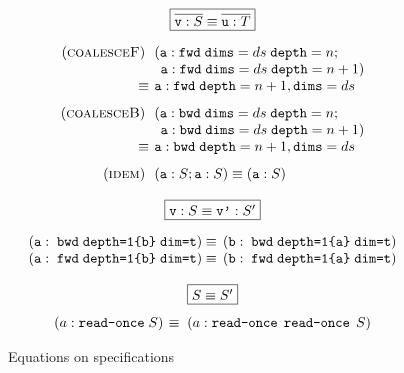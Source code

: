 \documentclass[9pt]{sigplanconf}
\theoremstyle{definition}
\begin{document}
\begin{figure}
\begin{align*}
\hspace{-1em}
\setlength{\arraycolsep}{0.05em}
\begin{array}{c}
\framebox{$\overline{\texttt{v} : S} \equiv \overline{\texttt{u} : T}$} \\[1em]
\begin{array}{rl}
(\textsc{coalesceF}) \;\; & (\texttt{a} : \texttt{fwd} \;
                       \texttt{dims}=ds \; \texttt{depth}=n; \\
&  \;\, \texttt{a} :  \texttt{fwd} \; \texttt{dims}=ds \; \texttt{depth}=n+1)\\
\equiv \; & \texttt{a} :  \texttt{fwd} \; \texttt{depth}=n+1,
         \texttt{dims}=ds \\[0.75em]
(\textsc{coalesceB}) \;\; & (\texttt{a} : \texttt{bwd} \;
                       \texttt{dims}=ds \; \texttt{depth}=n; \\
&  \;\, \texttt{a} :  \texttt{bwd} \; \texttt{dims}=ds \; \texttt{depth}=n+1) \\
\equiv \; & \texttt{a} :  \texttt{bwd} \; \texttt{depth}=n+1,
         \texttt{dims}=ds \\[0.75em]
(\textsc{idem}) \;\; & (\texttt{a} : S; \texttt{a} : S) \equiv (\texttt{a}
                  : S)
\end{array} \\ \\
\framebox{$\texttt{v} : S \equiv \texttt{v'} : S'$} \\[1em]
\begin{array}{ll}
(\texttt{a} : \; \texttt{bwd} \; \texttt{depth=1\{b\}} \;
  \texttt{dim=t})
\, & \equiv \,
(\texttt{b} : \; \texttt{bwd} \; \texttt{depth=1\{a\}} \;
  \texttt{dim=t})
\\
(\texttt{a} : \; \texttt{fwd} \; \texttt{depth=1\{b\}}\;
  \texttt{dim=t})
\, & \equiv \,
(\texttt{b} : \; \texttt{fwd} \; \texttt{depth=1\{a\}} \;
  \texttt{dim=t})
\end{array}
\\ \\
\framebox{$S \equiv S'$} \\[0.75em]
\begin{array}{ll}
(a : \texttt{read-once} \; S) \; & \equiv \; (a : \texttt{read-once} \;\,
  \texttt{read-once} \; \, S)
\end{array}
\end{array}
\end{align*}
\caption{Equations on specifications}
\label{fig:equations}
\end{figure}
\end{document}
